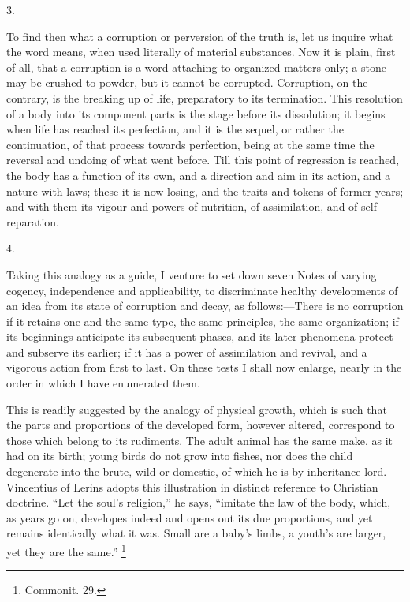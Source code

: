 3.

To find then what a corruption or perversion of the
truth is, let us inquire what the word means, when used
literally of material substances. Now it is plain, first
of all, that a corruption is a word attaching to
organized matters only; a stone may be crushed to powder,
but it cannot be corrupted. Corruption, on the contrary,
is the breaking up of life, preparatory to its
termination. This resolution of a body into its component
parts is the stage before its dissolution; it begins when
life has reached its perfection, and it is the sequel, or
rather the continuation, of that process towards
perfection, being at the same time the reversal and
undoing of what went before. Till this point of
regression is reached, the body has a function of its
own, and a direction and aim in its action, and a nature
with laws; these it is now losing, and the traits and
tokens of former years; and with them its vigour and
powers of nutrition, of assimilation, and of
self-reparation.

4.

Taking this analogy as a guide, I venture to set down
seven Notes of varying cogency, independence and
applicability, to discriminate healthy developments of an
idea from its state of corruption and decay, as
follows:—There is no corruption if it retains one
and the same type, the same principles, the same
organization; if its beginnings anticipate its subsequent
phases, and its later phenomena protect and subserve its
earlier; if it has a power of assimilation and revival,
and a vigorous action from first to last. On these tests
I shall now enlarge, nearly in the order in which I have
enumerated them.


This is readily suggested by the analogy of physical
growth, which is such that the parts and proportions of
the developed form, however altered, correspond to those
which belong to its rudiments. The adult animal has the same make, as it had on its birth; young birds do not
grow into fishes, nor does the child degenerate into the
brute, wild or domestic, of which he is by inheritance
lord. Vincentius of Lerins adopts this illustration in
distinct reference to Christian doctrine. ``Let the
soul's religion,'' he says, ``imitate the law of
the body, which, as years go on, developes indeed and
opens out its due proportions, and yet remains
identically what it was. Small are a baby's limbs, a
youth's are larger, yet they are the same.'' \footnote{Commonit. 29.}


